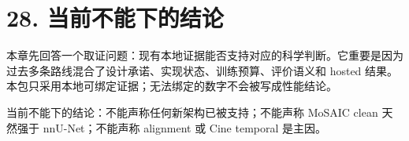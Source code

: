 \section{28. 当前不能下的结论}

本章先回答一个取证问题：现有本地证据能否支持对应的科学判断。它重要是因为过去多条路线混合了设计承诺、实现状态、训练预算、评价语义和 hosted 结果。本包只采用本地可绑定证据；无法绑定的数字不会被写成性能结论。



当前不能下的结论：不能声称任何新架构已被支持；不能声称 MoSAIC clean 天然强于 nnU-Net；不能声称 alignment 或 Cine temporal 是主因。



\clearpage